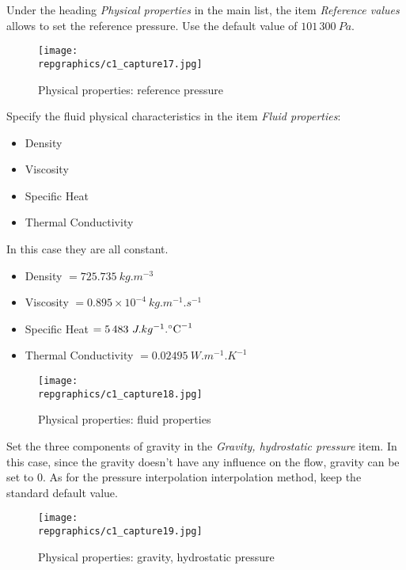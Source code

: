 \clearpage
Under the heading {\itshape Physical properties} in the main list,
the item {\itshape Reference values} allows to set the reference pressure.
Use the default value of $101\,300\ Pa$.

\begin{figure}[ht]
\begin{center}
\texttt{[image: \\repgraphics/c1\_capture17.jpg]}
\caption{Physical properties: reference pressure}
\label{fig17_e1}
\end{center}
\end{figure}


\clearpage
Specify the fluid physical characteristics in the item {\itshape Fluid
properties}:
\begin{itemize}
        \item Density
        \item Viscosity
        \item Specific Heat
        \item Thermal Conductivity
\end{itemize}

In this case they are all constant.
\begin{itemize}
        \item Density $ = 725.735\ kg.m^{-3}$
        \item Viscosity $ = 0.895\times 10^{-4}\ kg.m^{-1}.s^{-1}$
        \item Specific Heat $  = 5\,483\ J.kg^{-1}.\mbox{\degresC}^{-1}$
        \item Thermal Conductivity $ = 0.02495\ W.m^{-1}.K^{-1}$
\end{itemize}

\begin{figure}[ht]
\begin{center}
\texttt{[image: \\repgraphics/c1\_capture18.jpg]}
\caption{Physical properties: fluid properties}
\label{fig18_e1}
\end{center}
\end{figure}


\clearpage
Set the three components of gravity in the
{\itshape Gravity, hydrostatic pressure} item.
In this case, since the gravity doesn't have
any influence on the flow, gravity can be set to 0.
As for the pressure interpolation interpolation method, keep the standard
default value.

\begin{figure}[ht]
\begin{center}
\texttt{[image: \\repgraphics/c1\_capture19.jpg]}
\caption{Physical properties: gravity, hydrostatic pressure}
\label{fig19_e1}
\end{center}
\end{figure}


